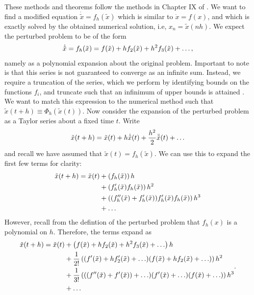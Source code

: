 These methods and theorems follow the methods in Chapter IX of \cite{gni2006}.
We want to find a modified equation $\dot{\tilde{x}} = f_h (\tilde{x})$ which is similar to $\dot{x} = f(x)$,
and which is exactly solved by the obtained numerical solution, i.e, $x_n = \tilde{x}(nh)$.
We expect the perturbed problem to be of the form
\begin{equation*}
	\dot{\tilde{x}} = f_h(\tilde{x}) = f(\tilde{x}) + h f_2(\tilde{x}) + h^2 f_3(\tilde{x}) + \mathellipsis,
\end{equation*}
namely as a polynomial expansion about the original problem. Important to note is that this series is not guaranteed to converge as an infinite sum.
Instead, we require a truncation of the series,
which we perform by identifying bounds on the functions $f_i$, and truncate such that an infinimum of upper bounds is attained \cite{Casas_2016}.
We want to match this expression to the numerical method such that $\tilde{x}(t+h) \equiv \Phi_h(\tilde{x}(t))$.
Now consider the expansion of the perturbed problem as a Taylor series about a fixed time $t$. Write
\begin{equation*}
	\tilde{x}(t+h) = \tilde{x}(t) + h \dot{\tilde{x}}(t) + \frac{h^2}{2} \ddot{\tilde{x}}(t) + \mathellipsis
\end{equation*}
and recall we have assumed that $\tilde{x}(t) = f_h(\tilde{x})$.
We can use this to expand the first few terms for clarity:
\begin{equation*}
	\begin{aligned}
		\tilde{x}(t+h) = \tilde{x}(t) &+ \left(
			f_h(\tilde{x})
		\right)h \\
		&+ \left(
			f'_h(\tilde{x})f_h(\tilde{x})
		\right)h^2 \\
		&+ \left(
			(f''_h(\tilde{x})+f'_h(\tilde{x}))f'_h(\tilde{x})f_h(\tilde{x})
		\right)h^3 \\
		&+ \mathellipsis
	\end{aligned}
\end{equation*}
However, recall from the defintion of the perturbed problem that $f_h(x)$ is a polynomial on $h$.
Therefore, the terms expand as
\begin{equation*}
	\begin{aligned}
		\tilde{x}(t+h) = \tilde{x}(t) &+ \left(
			f(\tilde{x}) + h f_2(\tilde{x}) + h^2 f_3(\tilde{x}) + \mathellipsis
 		\right)h \\
		&+ \frac{1}{2!}\left(
			(f'(\tilde{x}) + h f'_2(\tilde{x})  + \mathellipsis)
			(f(\tilde{x}) + h f_2(\tilde{x}) + \mathellipsis)
		\right)h^2 \\
		&+ \frac{1}{3!}\left(
			((f''(\tilde{x}) + f'(\tilde{x})) + \mathellipsis)
			(f'(\tilde{x}) + \mathellipsis)
			(f(\tilde{x}) + \mathellipsis)
		\right)h^3 \\
		&+ \mathellipsis
	\end{aligned}.
\end{equation*}
